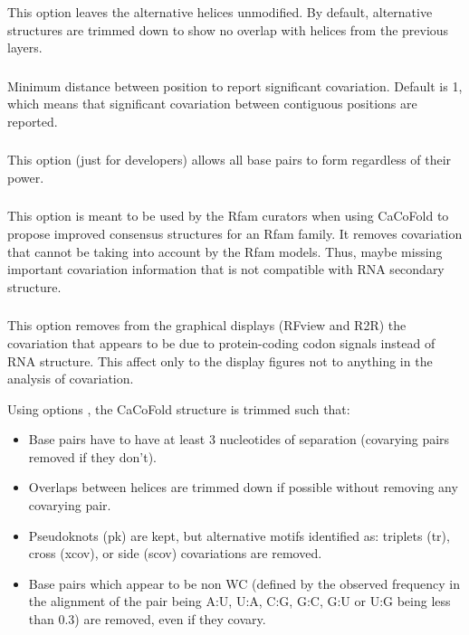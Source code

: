 \subsubsection{} This option leaves the alternative helices unmodified. By default, alternative structures are trimmed down to show no overlap with helices from the previous layers.

\subsubsection{} Minimum distance between position to report significant covariation. Default is 1, which means that significant covariation between
contiguous positions are reported.

\subsubsection{} This option (just for developers) allows all base pairs to form regardless of their power.

\subsubsection{} This option is meant to be used by the Rfam curators when using CaCoFold to propose improved consensus structures for an Rfam family. It removes covariation that cannot be taking into account by the Rfam models. Thus, maybe missing important covariation information that is not compatible with RNA secondary structure.

\subsubsection{} This option removes from the graphical displays (RFview and R2R) the covariation that appears to be due to protein-coding codon signals instead of RNA structure. This affect only to the display figures not to anything in the analysis of covariation.

\noindent
Using options , the CaCoFold structure is trimmed such that:
\begin{itemize}
\item Base pairs have to have at least 3 nucleotides of separation (covarying pairs removed if they don't).
\item Overlaps between helices are trimmed down if possible without removing any covarying pair.
\item Pseudoknots (pk) are kept, but alternative motifs identified as: triplets (tr), cross (xcov), or side (scov) covariations are removed.
\item Base pairs which appear to be non WC (defined by the observed frequency in the alignment of the pair being  A:U, U:A, C:G, G:C, G:U or U:G being less than 0.3) are removed, even if they covary.
\end{itemize}

